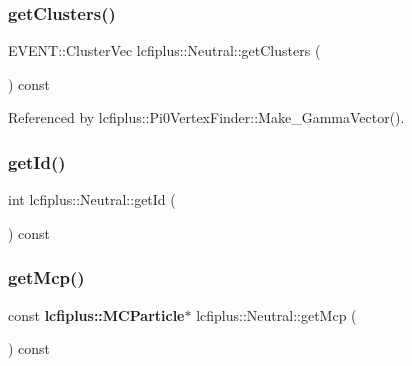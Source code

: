 \mbox{\label{classlcfiplus_1_1Neutral_a00308ce5b11c9f0f6b5e39424dfecf58}} 
\subsubsection{get\+Clusters()}
{\footnotesize\ttfamily E\+V\+E\+N\+T\+::\+Cluster\+Vec lcfiplus\+::\+Neutral\+::get\+Clusters (\begin{DoxyParamCaption}{ }\end{DoxyParamCaption}) const\hspace{0.3cm}{\ttfamily [inline]}}



Referenced by lcfiplus\+::\+Pi0\+Vertex\+Finder\+::\+Make\+\_\+\+Gamma\+Vector().

\mbox{\label{classlcfiplus_1_1Neutral_a92ec42009cedcf597b8faff662be5176}} 
\subsubsection{get\+Id()}
{\footnotesize\ttfamily int lcfiplus\+::\+Neutral\+::get\+Id (\begin{DoxyParamCaption}{ }\end{DoxyParamCaption}) const\hspace{0.3cm}{\ttfamily [inline]}}

\mbox{\label{classlcfiplus_1_1Neutral_a7eea9d2d1e8da6d90b832688bbf3a5e9}} 
\subsubsection{get\+Mcp()}
{\footnotesize\ttfamily const \textbf{ lcfiplus\+::\+M\+C\+Particle}$\ast$ lcfiplus\+::\+Neutral\+::get\+Mcp (\begin{DoxyParamCaption}{ }\end{DoxyParamCaption}) const\hspace{0.3cm}{\ttfamily [inline]}}

\mbox{\label{classlcfiplus_1_1Neutral_acde3b42bf34d007cbf2459483c5e4dfd}} 
